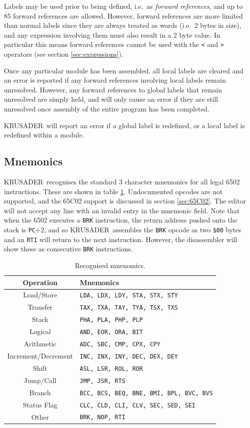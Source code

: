 \documentclass[12pt]{article}
\newcommand{\krusader}{\textsf{KRUSADER}}
\begin{document}
Labels may be used prior to being defined, i.e.~as \textit{forward references}, and up to 85 forward references are allowed. However, forward references are more limited than normal
labels since they are always treated as words (i.e.~2 bytes in size), and any expression
involving them must also result in a 2 byte value. 
In particular this means forward references cannot be used with the \texttt{<} and \texttt{>} operators (see section \ref{sec:expressions}).

Once any particular module has been assembled, 
all local labels are cleared and an error is reported if any forward references
involving local labels remain unresolved.  However, any forward references 
to global labels that remain unresolved are simply held, and will only cause
an error if they are still unresolved once assembly of the entire program 
has been completed.

\krusader\ will report an error if a global label is redefined, or a local label is redefined within a module.

\subsection{Mnemonics}
\label{sec:mnemonics}

\krusader\ recognises the standard 3 character mnemonics for all legal 6502 instructions.  These are shown in table \ref{tab:mnemonics}.  Undocumented opcodes are not supported, and the 65C02 support is discussed in section \ref{sec:65C02}.
The editor will not accept any line with an invalid entry in the mnemonic field.
Note that when the 6502 executes a \texttt{BRK} instruction, the return address pushed
onto the stack is \texttt{PC}$+2$, and so \krusader\ assembles the \texttt{BRK} opcode as two \texttt{\$00} bytes
and an \texttt{RTI} will return to the next instruction.
However, the disassembler will show these as consecutive \texttt{BRK} instructions.
\begin{table}[htb]
	\centering
	\begin{tabular}{|c|l|} \hline
	\textbf{Operation} & \textbf{Mnemonics} \tabularnewline
	\hline
	Load/Store & \texttt{LDA, LDX, LDY, STA, STX, STY} \tabularnewline\hline
	Transfer & \texttt{TAX, TXA, TAY, TYA, TSX, TXS} \tabularnewline\hline
	Stack & \texttt{PHA, PLA, PHP, PLP} \tabularnewline\hline
	Logical & \texttt{AND, EOR, ORA, BIT} \tabularnewline\hline
	Arithmetic & \texttt{ADC, SBC, CMP, CPX, CPY} \tabularnewline\hline
	Increment/Decrement & \texttt{INC, INX, INY, DEC, DEX, DEY} \tabularnewline\hline
	Shift & \texttt{ASL, LSR, ROL, ROR} \tabularnewline\hline
	Jump/Call & \texttt{JMP, JSR, RTS} \tabularnewline\hline
	Branch & \texttt{BCC, BCS, BEQ, BNE, BMI, BPL, BVC, BVS} \tabularnewline\hline
	Status Flag & \texttt{CLC, CLD, CLI, CLV, SEC, SED, SEI} \tabularnewline\hline
	Other & \texttt{BRK, NOP, RTI} \tabularnewline
	\hline
	\end{tabular}
	\caption{Recognised mnenomics.}
	\label{tab:mnemonics}
\end{table}
\end{document}
